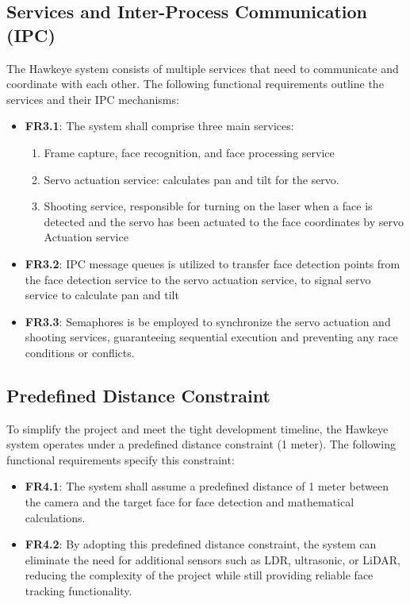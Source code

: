 \documentclass[a4paper,11pt]{article}%
\begin{document}
\subsection{Services and Inter-Process Communication (IPC)}
The Hawkeye system consists of multiple services that need to communicate and coordinate with each other. The following functional requirements outline the services and their IPC mechanisms:
\begin{itemize}
    \item \textbf{FR3.1}: The system shall comprise three main services:
          \begin{enumerate}
              \item Frame capture, face recognition, and face processing service
              \item Servo actuation service: calculates pan and tilt for the servo.
              \item Shooting service, responsible for turning on the laser when a face is detected and the servo has been actuated to the face coordinates by servo Actuation service
          \end{enumerate}
    \item \textbf{FR3.2}: IPC message queues is utilized to transfer face detection points from the face detection service to the servo actuation service, to signal servo service to calculate pan and tilt
    \item \textbf{FR3.3}: Semaphores is be employed to synchronize the servo actuation and shooting services, guaranteeing sequential execution and preventing any race conditions or conflicts.
\end{itemize}
\subsection{Predefined Distance Constraint}
To simplify the project and meet the tight development timeline, the Hawkeye system operates under a predefined distance constraint (1 meter). The following functional requirements specify this constraint:
\begin{itemize}
    \item \textbf{FR4.1}: The system shall assume a predefined distance of 1 meter between the camera and the target face for face detection and mathematical calculations.
    \item \textbf{FR4.2}: By adopting this predefined distance constraint, the system can eliminate the need for additional sensors such as LDR, ultrasonic, or LiDAR, reducing the complexity of the project while still providing reliable face tracking functionality.
\end{itemize}
\end{document}
